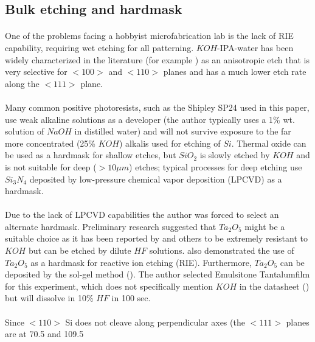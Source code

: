 \documentclass[twocolumn]{article}
\begin{document}
\subsection{Bulk etching and hardmask}
\paragraph*{}
One of the problems facing a hobbyist microfabrication lab is the lack of RIE capability, requiring
wet etching for all patterning. $KOH$-IPA-water has been widely characterized in the literature (for
example \cite{SmoothWalls}) as an anisotropic etch that is very selective for $<100>$ and $<110>$
planes and has a much lower etch rate along the $<111>$ plane.

\paragraph*{}
Many common positive photoresists, such as the Shipley SP24 used in this paper, use weak alkaline
solutions as a developer (the author typically uses a 1\% wt. solution of $NaOH$ in distilled water)
and will not survive exposure to the far more concentrated (25\% $KOH$) alkalis used for etching of
$Si$. Thermal oxide can be used as a hardmask for shallow etches, but $SiO_2$ is slowly etched by
$KOH$ and is not suitable for deep ($>10 \mu m$) etches; typical processes for deep etching use
$Si_3N_4$ deposited by low-pressure chemical vapor deposition (LPCVD) as a hardmask.

\paragraph*{}
Due to the lack of LPCVD capabilities the author was forced to select an alternate hardmask.
Preliminary research suggested that $Ta_2O_5$ might be a suitable choice as it has been reported by
\cite{Christiansen} and others to be extremely resistant to $KOH$ but can be etched by dilute $HF$
solutions. \cite{Nanodots} also demonstrated the use of $Ta_2O_5$ as a hardmask for reactive ion
etching (RIE). Furthermore, $Ta_2O_5$ can be deposited by the sol-gel method (\cite{Dielectric}).
The author selected Emulsitone Tantalumfilm for this experiment, which does not specifically mention
$KOH$ in the datasheet (\cite{Taf}) but will dissolve in 10\% $HF$ in 100 sec.

\paragraph*{}
Since $<110>$ Si does not cleave along perpendicular axes (the $<111>$ planes are at 70.5 and 109.5
\end{document}
